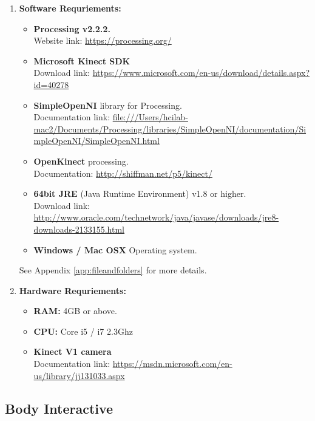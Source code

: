 \begin{enumerate}
\item \textbf{Software Requriements:}

\begin{itemize}
\item \textbf{Processing v2.2.2.} \\
Website link: \url{https://processing.org/}

\item \textbf{Microsoft Kinect SDK} \\
Download link: \url{https://www.microsoft.com/en-us/download/details.aspx?id=40278}

\item \textbf{SimpleOpenNI} library for Processing. \\
Documentation link: \url{file:///Users/hcilab-mac2/Documents/Processing/libraries/SimpleOpenNI/documentation/SimpleOpenNI/SimpleOpenNI.html} 

\item \textbf{OpenKinect} processing. \\
Documentation: \url{http://shiffman.net/p5/kinect/}

\item \textbf{64bit JRE} (Java Runtime Environment) v1.8 or higher. \\
Download link: \url{http://www.oracle.com/technetwork/java/javase/downloads/jre8-downloads-2133155.html}

\item \textbf{Windows / Mac OSX} Operating system.

\end{itemize}


See Appendix \ref{app:fileandfolders} for more details.

\item \textbf{Hardware Requriements:}

\begin{itemize}
\item \textbf{RAM:} 4GB or above.
\item \textbf{CPU:} Core i5 / i7 2.3Ghz
\item \textbf{Kinect V1 camera} \\
Documentation link: \url{https://msdn.microsoft.com/en-us/library/jj131033.aspx}

\end{itemize}


\end{enumerate}

\subsection{Body Interactive}

